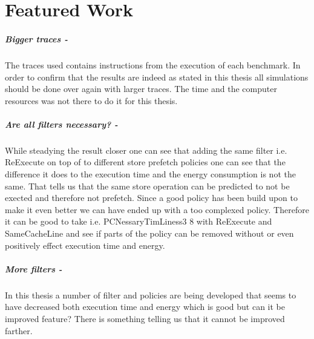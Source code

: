 \chapter{Featured Work}
\label{chap:fetueredWork}

\paragraph{Bigger traces -} The traces used contains \fixme instructions from the execution of each benchmark. In order to confirm that the results are indeed as stated in this thesis all simulations should be done over again with larger traces. The time and the computer resources was not there to do it for this thesis.

\paragraph{Are all filters necessary? -} While steadying the result closer one can see that adding the same filter i.e. ReExecute on top of to different store prefetch policies one can see that the difference it does to the execution time and the energy consumption is not the same. That tells us that the same store operation can be predicted to not be exected and therefore not prefetch. Since a good policy has been build upon to make it even better we can have ended up with a too complexed policy. Therefore it can be good to take i.e. PCNessaryTimLiness3 8 with ReExecute and SameCacheLine and see if parts of the policy can be removed without or even positively effect execution time and energy. 

\paragraph{More filters -} In this thesis a number of filter and policies are being developed that seems to have decreased both execution time and energy which is good but can it be improved feature? There is something telling us that it cannot be improved farther.
